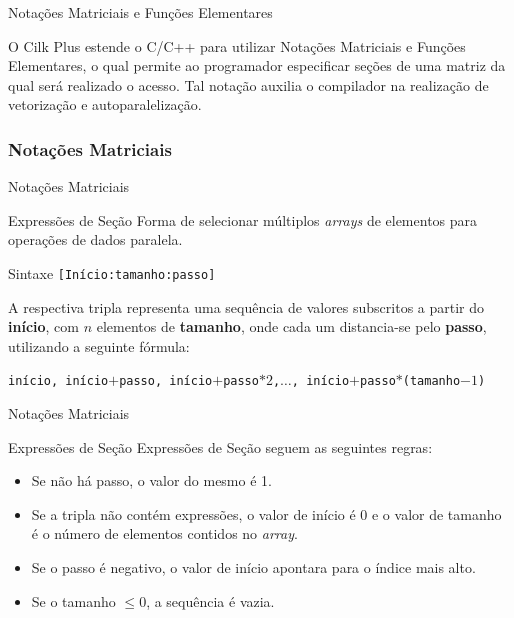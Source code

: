 \documentclass{beamer}
\begin{document}
\begin{frame}{Notações Matriciais e Funções Elementares}
\begin{block}{}
\centering
    O Cilk Plus estende o C/C++ para utilizar Notações Matriciais e Funções 
    Elementares, o qual permite ao programador especificar seções de uma matriz 
    da qual será realizado o acesso. Tal notação auxilia o compilador na 
    realização de vetorização e autoparalelização.
\end{block}
\end{frame}

\subsubsection{Notações Matriciais}
\begin{frame}{Notações Matriciais}
\begin{block}{Expressões de Seção}
    Forma de selecionar múltiplos \textit{arrays} de elementos para operações de dados paralela.
\begin{block}{Sintaxe}
    \texttt{[Início:tamanho:passo]}
\end{block}
    A respectiva tripla representa uma sequência de valores subscritos a partir 
    do \textbf{início}, com $n$ elementos de \textbf{tamanho}, onde cada um 
    distancia-se pelo \textbf{passo}, utilizando a seguinte fórmula:
\begin{block}{}
    \centering
\begin{small}
    \texttt{início, início$+$passo, início$+$passo$*2$,$\ldots$, início$+$passo$*$(tamanho$-1$)}
\end{small}
\end{block}
\end{block}

\end{frame}

\begin{frame}{Notações Matriciais}
\begin{block}{Expressões de Seção}
    Expressões de Seção seguem as seguintes regras:
\begin{itemize}
    \item Se não há passo, o valor do mesmo é 1.
	\item Se a tripla não contém expressões, o valor de início é $0$ e o 
	valor de tamanho é o número de elementos contidos no \textit{array}.
	\item Se o passo é negativo, o valor de início apontara para o índice mais alto.
	\item Se o tamanho $\leq 0$, a sequência é vazia.
\end{itemize}
\end{block}

\end{frame}
\end{document}
